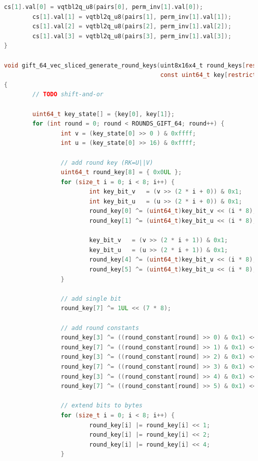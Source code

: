 \documentclass[12pt]{report}
\begin{document}
\begin{lstlisting}[language=c, caption={gift\_vec\_sliced.c}]
        cs[1].val[0] = vqtbl2q_u8(pairs[0], perm_inv[1].val[0]);
        cs[1].val[1] = vqtbl2q_u8(pairs[1], perm_inv[1].val[1]);
        cs[1].val[2] = vqtbl2q_u8(pairs[2], perm_inv[1].val[2]);
        cs[1].val[3] = vqtbl2q_u8(pairs[3], perm_inv[1].val[3]);
}

void gift_64_vec_sliced_generate_round_keys(uint8x16x4_t round_keys[restrict ROUNDS_GIFT_64][2],
                                            const uint64_t key[restrict 2])
{
        // TODO shift-and-or

        uint64_t key_state[] = {key[0], key[1]};
        for (int round = 0; round < ROUNDS_GIFT_64; round++) {
                int v = (key_state[0] >> 0 ) & 0xffff;
                int u = (key_state[0] >> 16) & 0xffff;

                // add round key (RK=U||V)
                uint64_t round_key[8] = { 0x0UL };
                for (size_t i = 0; i < 8; i++) {
                        int key_bit_v   = (v >> (2 * i + 0)) & 0x1;
                        int key_bit_u   = (u >> (2 * i + 0)) & 0x1;
                        round_key[0] ^= (uint64_t)key_bit_v << (i * 8);
                        round_key[1] ^= (uint64_t)key_bit_u << (i * 8);

                        key_bit_v   = (v >> (2 * i + 1)) & 0x1;
                        key_bit_u   = (u >> (2 * i + 1)) & 0x1;
                        round_key[4] ^= (uint64_t)key_bit_v << (i * 8);
                        round_key[5] ^= (uint64_t)key_bit_u << (i * 8);
                }

                // add single bit
                round_key[7] ^= 1UL << (7 * 8);

                // add round constants
                round_key[3] ^= ((round_constant[round] >> 0) & 0x1) << (0 * 8);
                round_key[7] ^= ((round_constant[round] >> 1) & 0x1) << (0 * 8);
                round_key[3] ^= ((round_constant[round] >> 2) & 0x1) << (1 * 8);
                round_key[7] ^= ((round_constant[round] >> 3) & 0x1) << (1 * 8);
                round_key[3] ^= ((round_constant[round] >> 4) & 0x1) << (2 * 8);
                round_key[7] ^= ((round_constant[round] >> 5) & 0x1) << (2 * 8);

                // extend bits to bytes
                for (size_t i = 0; i < 8; i++) {
                        round_key[i] |= round_key[i] << 1;
                        round_key[i] |= round_key[i] << 2;
                        round_key[i] |= round_key[i] << 4;
                }


\end{lstlisting}
\end{document}
